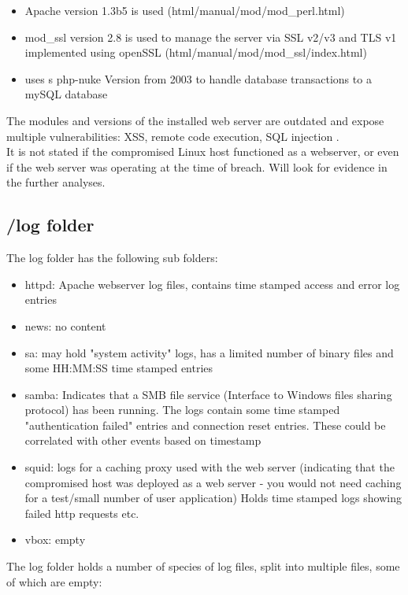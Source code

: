 \documentclass[
	letterpaper, %
	10pt, %
	unnumberedsections, %
	twoside, %
]{APAAssignment}
\begin{document}
\begin{itemize}
	\item Apache version 1.3b5 is used (html/manual/mod/mod\_perl.html)
	\item mod\_ssl version 2.8 is used to manage the server via SSL v2/v3 and TLS v1 implemented using openSSL (html/manual/mod/mod\_ssl/index.html)
	\item uses s php-nuke Version from 2003 to handle database transactions to a mySQL database
\end{itemize}


The modules and versions of the installed web server are outdated and expose multiple vulnerabilities: XSS, remote code execution, SQL injection \cite{Apache1.3Vulnerabilities}. \\

It is not stated if the compromised Linux host functioned as a webserver, or even if the web server was operating at the time of breach. Will look for evidence in the further analyses.

\subsection{/log folder}
The log folder has the following sub folders:
\begin{itemize}
	\item httpd: Apache webserver log files, contains time stamped access and error log entries
	\item news: no content
	\item sa: may hold "system activity" logs, has a limited number of binary files and some HH:MM:SS time stamped entries
	\item samba: Indicates that a SMB file service (Interface to Windows files sharing protocol) has been running. The logs contain some time stamped "authentication failed" entries and connection reset entries. These could be correlated with other events based on timestamp
	\item squid: logs for a caching proxy used with the web server (indicating that the compromised host was deployed as a web server - you would not need caching for a test/small number of user application) Holds time stamped logs showing failed http requests etc.
	\item vbox: empty
\end{itemize}

The log folder holds a number of species of log files, split into multiple files, some of which are empty:
\end{document}
